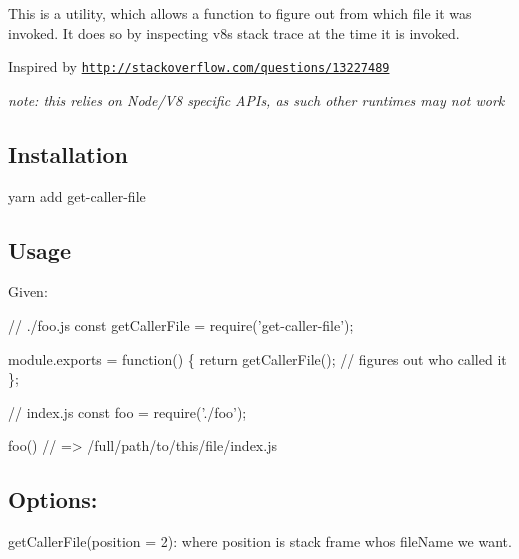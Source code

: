 \href{https://travis-ci.org/stefanpenner/get-caller-file}{\tt } \href{https://ci.appveyor.com/project/embercli/get-caller-file/branch/master}{\tt }

This is a utility, which allows a function to figure out from which file it was invoked. It does so by inspecting v8\textquotesingle{}s stack trace at the time it is invoked.

Inspired by \href{http://stackoverflow.com/questions/13227489}{\tt http\+://stackoverflow.\+com/questions/13227489}

{\itshape note\+: this relies on Node/\+V8 specific A\+P\+Is, as such other runtimes may not work}

\subsection*{Installation}


\begin{DoxyCode}
yarn add get-caller-file
\end{DoxyCode}


\subsection*{Usage}

Given\+:


\begin{DoxyCode}
// ./foo.js
const getCallerFile = require('get-caller-file');

module.exports = function() \{
  return getCallerFile(); // figures out who called it
\};
\end{DoxyCode}



\begin{DoxyCode}
// index.js
const foo = require('./foo');

foo() // => /full/path/to/this/file/index.js
\end{DoxyCode}


\subsection*{Options\+:}


\begin{DoxyItemize}
\item {\ttfamily get\+Caller\+File(position = 2)}\+: where position is stack frame whos file\+Name we want. 
\end{DoxyItemize}